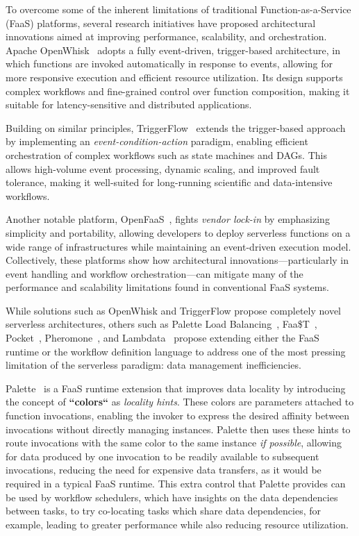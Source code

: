 To overcome some of the inherent limitations of traditional Function-as-a-Service (FaaS) platforms, several research initiatives have proposed architectural innovations aimed at improving performance, scalability, and orchestration. Apache OpenWhisk~\cite{open_whisk} adopts a fully event-driven, trigger-based architecture, in which functions are invoked automatically in response to events, allowing for more responsive execution and efficient resource utilization. Its design supports complex workflows and fine-grained control over function composition, making it suitable for latency-sensitive and distributed applications. 

Building on similar principles, TriggerFlow~\cite{triggerflow} extends the trigger-based approach by implementing an \textit{event-condition-action} paradigm, enabling efficient orchestration of complex workflows such as state machines and DAGs. This allows high-volume event processing, dynamic scaling, and improved fault tolerance, making it well-suited for long-running scientific and data-intensive workflows. 

Another notable platform, OpenFaaS~\cite{openfaas}, fights \textit{vendor lock-in} by emphasizing simplicity and portability, allowing developers to deploy serverless functions on a wide range of infrastructures while maintaining an event-driven execution model. Collectively, these platforms show how architectural innovations—particularly in event handling and workflow orchestration—can mitigate many of the performance and scalability limitations found in conventional FaaS systems.

While solutions such as OpenWhisk and TriggerFlow propose completely novel serverless architectures, others such as Palette Load Balancing~\cite{palette_load_balancing}, Faa\$T~\cite{faast_caching}, Pocket~\cite{pocket}, Pheromone~\cite{pheromone}, and Lambdata~\cite{lambdata_intents} propose extending either the FaaS runtime or the workflow definition language to address one of the most pressing limitation of the serverless paradigm: data management inefficiencies.

Palette~\cite{palette_load_balancing} is a FaaS runtime extension that improves data locality by introducing the concept of \textbf{``colors``} as \textit{locality hints}. These colors are parameters attached to function invocations, enabling the invoker to express the desired affinity between invocations without directly managing instances. Palette then uses these hints to route invocations with the same color to the same instance \textit{if possible}, allowing for data produced by one invocation to be readily available to subsequent invocations, reducing the need for expensive data transfers, as it would be required in a typical FaaS runtime. This extra control that Palette provides can be used by workflow schedulers, which have insights on the data dependencies between tasks, to try co-locating tasks which share data dependencies, for example, leading to greater performance while also reducing resource utilization.

